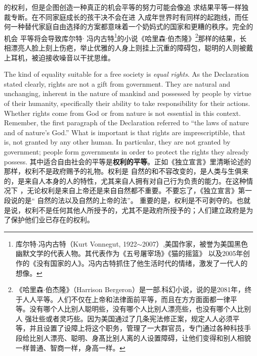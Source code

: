 \begin{paracol}{2}
\begin{itemize}
	的权利，但是企图创造一种真正的机会平等的努力可能会像追
	求结果平等一样独裁专断。在不同家庭成长的孩干决不会在进
	入成年世界时有同样的起跑线，而任何一种替代家庭自由选择的方案都意味着一个奶妈式的国家和更糟的秩序。完全的机会
	平等将会导致库尔特$\cdot$ 冯内古特\footnote{库尔特$\cdot$冯内古特（Kurt  Vonnegut, 1922$\sim$2007）,美国作家，被誉为美国黑色幽默文学的代表人物。其代表作为《五号屠宰场》《猫的摇篮》 以及2005年创作的《没有国家的人》。冯内古特抓住了他生活时代的情绪，激发了一代人的想像。}的小说《哈里森$\cdot$伯杰隆》\footnote{《哈里森$\cdot$伯杰隆》（Harrison Bergeron）是一部.科幻小说，说的是2081年，终于人人平等。人们不仅在上帝和法律面前平等，而且在方方面面都一律平		等。没有哪个人比别人聪明些，没有哪个人比别人漂亮些，也没有哪个人比别人	强壮些或者灵巧些。因为美国通过了几条宪法修正案，规定人人必须平等，并且设置了设障上将这个职务，管理了一大群官员，专门通过各种科技手段给比别人漂亮、聪明、身髙比别人离的人设置障碍，让他们变得和别人相貌一样普通、智商一样，身高一样。}那样的结果，长相漂亮人脸上刻上伤疤，举止优雅的人身上则挂上沉重的障碍包，聪明的人则被戴上耳机，被迫接收噪音以干扰思维。
\end{itemize}
\switchcolumn*
The kind of equality suitable for a free society is \textit{equal rights}.
As the Declaration stated clearly, rights are not a gift from government. They are natural and unchanging, inherent in the nature of mankind and possessed by people by virtue of their
humanity, specifically their ability to take responsibility for
their actions. Whether rights come from God or from nature is
not essential in this context. Remember, the first paragraph of
the Declaration referred to ``the laws of nature and of nature's
God.'' What is important is that rights are imprescriptible, that
is, not granted by any other human. In particular, they are not
granted by government; people form governments in order to
protect the rights they already possess.
\switchcolumn
其中适合自由社会的平等是\textbf{权利的平等}。正如《独立宣言》里清晰论述的那样，权利不是政府赐予的礼物。权利是
自然的和不容改变的，是人类与生俱来的，是来自人本身的人的特性，尤其来自人拥有对自己行为负责的能力。在这种情况下 ，无论权利是来自上帝还是来自自然都不重要。不要忘了，《独立宣言》第一段说的是“ 自然的法以及自然的上帝的法”。
重要的是，权利是不可剥夺的。也就是说，权利不是任何其他人所授予的，尤其不是政府所授予的；人们建立政府是为了保护他们业已存在的权利。


\end{paracol}
